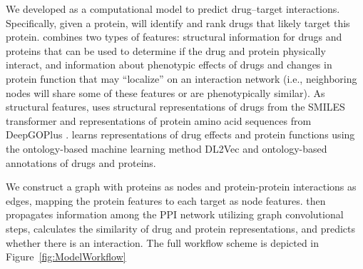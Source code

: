 \documentclass{bioinfo}
\renewcommand{\cite}{\citep}
\begin{document}

We developed \name{} as a computational model to predict drug--target
interactions. Specifically, given a protein, \name{} will identify and
rank drugs that likely target this protein. \name{} combines two types
of features: structural information for drugs and proteins that can be
used to determine if the drug and protein physically interact, and
information about phenotypic effects of drugs and changes in protein
function that may ``localize'' on an interaction network (i.e.,
neighboring nodes will share some of these features or are
phenotypically similar). As structural features, \name{} uses
structural representations of drugs from the SMILES transformer
\cite{SmilesTransformer} and representations of protein amino acid
sequences from DeepGOPlus \cite{DeepGoPlus}.  \name{} learns
representations of drug effects and protein functions using the
ontology-based machine learning method DL2Vec \cite{DL2vec2020} and
ontology-based annotations of drugs and proteins.

We construct a graph with proteins as nodes and protein-protein
interactions as edges, mapping the protein features to each target as
node features. \name{} then propagates information among the PPI network
utilizing graph convolutional steps, calculates the similarity of drug
and protein representations, and predicts whether there is an
interaction. The full workflow scheme is depicted in
Figure~\ref{fig:ModelWorkflow}

\end{document}
